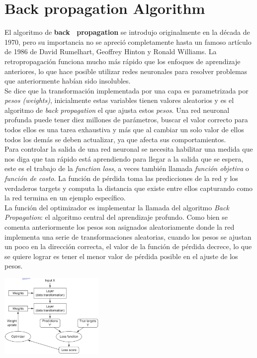 \documentclass{book}
\begin{document}
		\section{Back propagation Algorithm}
			El algoritmo de \textbf{back \ propagation} se introdujo originalmente en la d\'ecada de 1970, pero su importancia no se apreci\'o completamente hasta un famoso art\'iculo de 1986 de David Rumelhart, Geoffrey Hinton y Ronald Williams. La retropropagaci\'on funciona mucho m\'as r\'apido que los enfoques de aprendizaje anteriores, lo que hace posible utilizar redes neuronales para resolver problemas que anteriormente hab\'ian sido insolubles. \\
			Se dice que la transformaci\'on implementada por una capa es parametrizada por \textit{pesos (weights)}, inicialmente estas variables tienen valores aleatorios y es el algoritmo de \textit{back propagation} el que ajusta estos \textit{pesos}. Una red neuronal profunda puede tener diez millones de par\'ametros, buscar el valor correcto para todos ellos es una tarea exhaustiva y m\'as que al cambiar un solo valor de ellos todos los dem\'as se deben actualizar, ya que afecta sus comportamientos. \\
			Para controlar la salida de una red neuronal se necesita habilitar una medida que nos diga que tan r\'apido est\'a aprendiendo para llegar a la salida que se espera, este es el trabajo de la \textit{function loss}, a veces tambi\'en llamada \textit{funci\'on objetiva} o \textit{funci\'on de costo}. La funci\'on de p\'erdida toma las predicciones de la red y los verdaderos targets y computa la distancia que existe entre ellos capturando como la red termina en un ejemplo espec\'ifico. \\
			La funci\'on del optimizador es implementar la llamada del algoritmo \textit{Back Propagation}: el algoritmo central del aprendizaje profundo. Como bien se comenta anteriormente los pesos son asignados aleatoriamente donde la red implementa una serie de transformaciones aleatorias, cuando los pesos se ajustan un poco en la direcci\'on correcta, el valor de la funci\'on de p\'erdida decrece, lo que se quiere lograr es tener el menor valor de p\'erdida posible en el ajuste de los pesos. \\
			\begin{center}
				\includegraphics[width=5cm]{4.png}
			\end{center}
\end{document}

